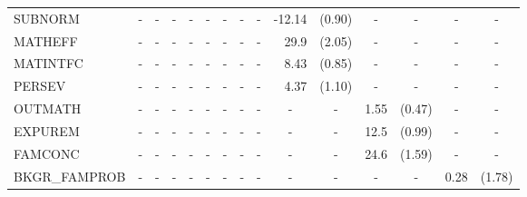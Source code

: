 \documentclass[10pt]{article}
\begin{document}
\begin{table}[htbp]
\begin{tabular}{lrlrlrlrlrlrlrl}
SUBNORM & \multicolumn{1}{c}{-} & \multicolumn{1}{c}{-} & \multicolumn{1}{c}{-} & \multicolumn{1}{c}{-} & \multicolumn{1}{c}{-} & \multicolumn{1}{c}{-} & \multicolumn{1}{c}{-} & \multicolumn{1}{c}{-} & -12.14 & (0.90) & \multicolumn{1}{c}{-} & \multicolumn{1}{c}{-} & \multicolumn{1}{c}{-} & \multicolumn{1}{c}{-} \\[0.2em]
MATHEFF & \multicolumn{1}{c}{-} & \multicolumn{1}{c}{-} & \multicolumn{1}{c}{-} & \multicolumn{1}{c}{-} & \multicolumn{1}{c}{-} & \multicolumn{1}{c}{-} & \multicolumn{1}{c}{-} & \multicolumn{1}{c}{-} & 29.9  & (2.05) & \multicolumn{1}{c}{-} & \multicolumn{1}{c}{-} & \multicolumn{1}{c}{-} & \multicolumn{1}{c}{-} \\[0.2em]
MATINTFC & \multicolumn{1}{c}{-} & \multicolumn{1}{c}{-} & \multicolumn{1}{c}{-} & \multicolumn{1}{c}{-} & \multicolumn{1}{c}{-} & \multicolumn{1}{c}{-} & \multicolumn{1}{c}{-} & \multicolumn{1}{c}{-} & 8.43  & (0.85) & \multicolumn{1}{c}{-} & \multicolumn{1}{c}{-} & \multicolumn{1}{c}{-} & \multicolumn{1}{c}{-} \\[0.2em]
PERSEV & \multicolumn{1}{c}{-} & \multicolumn{1}{c}{-} & \multicolumn{1}{c}{-} & \multicolumn{1}{c}{-} & \multicolumn{1}{c}{-} & \multicolumn{1}{c}{-} & \multicolumn{1}{c}{-} & \multicolumn{1}{c}{-} & 4.37  & (1.10) & \multicolumn{1}{c}{-} & \multicolumn{1}{c}{-} & \multicolumn{1}{c}{-} & \multicolumn{1}{c}{-} \\[0.2em]
OUTMATH & \multicolumn{1}{c}{-} & \multicolumn{1}{c}{-} & \multicolumn{1}{c}{-} & \multicolumn{1}{c}{-} & \multicolumn{1}{c}{-} & \multicolumn{1}{c}{-} & \multicolumn{1}{c}{-} & \multicolumn{1}{c}{-} & \multicolumn{1}{c}{-} & \multicolumn{1}{c}{-} & 1.55  & (0.47) & \multicolumn{1}{c}{-} & \multicolumn{1}{c}{-} \\[0.2em]
EXPUREM & \multicolumn{1}{c}{-} & \multicolumn{1}{c}{-} & \multicolumn{1}{c}{-} & \multicolumn{1}{c}{-} & \multicolumn{1}{c}{-} & \multicolumn{1}{c}{-} & \multicolumn{1}{c}{-} & \multicolumn{1}{c}{-} & \multicolumn{1}{c}{-} & \multicolumn{1}{c}{-} & 12.5  & (0.99) & \multicolumn{1}{c}{-} & \multicolumn{1}{c}{-} \\[0.2em]
FAMCONC & \multicolumn{1}{c}{-} & \multicolumn{1}{c}{-} & \multicolumn{1}{c}{-} & \multicolumn{1}{c}{-} & \multicolumn{1}{c}{-} & \multicolumn{1}{c}{-} & \multicolumn{1}{c}{-} & \multicolumn{1}{c}{-} & \multicolumn{1}{c}{-} & \multicolumn{1}{c}{-} & 24.6  & (1.59) & \multicolumn{1}{c}{-} & \multicolumn{1}{c}{-} \\[0.2em]
BKGR\_FAMPROB & \multicolumn{1}{c}{-} & \multicolumn{1}{c}{-} & \multicolumn{1}{c}{-} & \multicolumn{1}{c}{-} & \multicolumn{1}{c}{-} & \multicolumn{1}{c}{-} & \multicolumn{1}{c}{-} & \multicolumn{1}{c}{-} & \multicolumn{1}{c}{-} & \multicolumn{1}{c}{-} & \multicolumn{1}{c}{-} & \multicolumn{1}{c}{-} & 0.28  & (1.78) \\[0.2em]

\end{tabular}
\end{table}
\end{document}
